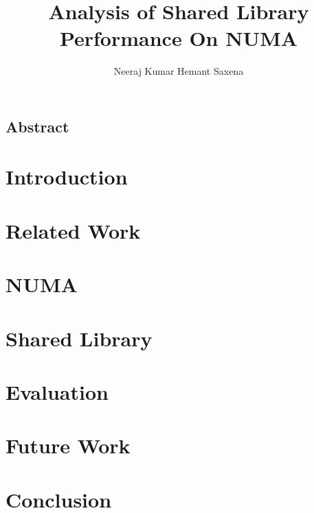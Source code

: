 \documentclass{acm_proc_article-sp}
\title{Analysis of Shared Library Performance On NUMA}
\author{
Neeraj Kumar
\alignauthor
Hemant Saxena
}
\begin{document}
\maketitle

\subsection*{Abstract}


\section{Introduction}


\section{Related Work}


\section{NUMA}


\section{Shared Library}


\section{Evaluation}


\section{Future Work}


\section{Conclusion}




\end{document}
